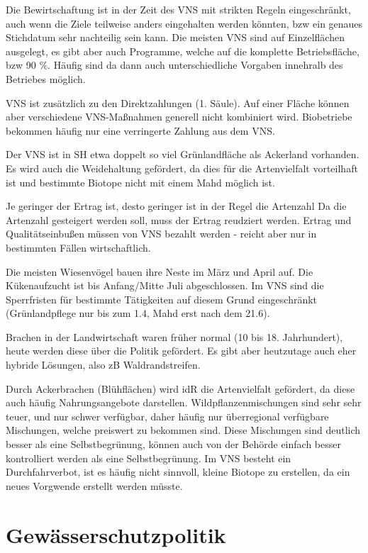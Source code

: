 \documentclass[11pt]{scrbook}
\begin{document}
Die Bewirtschaftung ist in der Zeit des \ac{VNS} mit strikten Regeln eingeschränkt, auch wenn die Ziele teilweise anders eingehalten werden könnten, bzw ein genaues Stichdatum sehr nachteilig sein kann.
Die meisten \ac{VNS} sind auf Einzelflächen ausgelegt, es gibt aber auch Programme, welche auf die komplette Betriebsfläche, bzw 90 \%.
Häufig sind da dann auch unterschiedliche Vorgaben innehralb des Betriebes möglich.

\ac{VNS} ist zusätzlich zu den Direktzahlungen (1. Säule).
Auf einer Fläche können aber verschiedene \ac{VNS}-Maßnahmen generell nicht kombiniert wird.
Biobetriebe bekommen häufig nur eine verringerte Zahlung aus dem \ac{VNS}.

Der \ac{VNS} ist in SH etwa doppelt so viel Grünlandfläche als Ackerland vorhanden.
Es wird auch die Weidehaltung gefördert, da dies für die Artenvielfalt vorteilhaft ist und bestimmte Biotope nicht mit einem Mahd möglich ist.

Je geringer der Ertrag ist, desto geringer ist in der Regel die Artenzahl
Da die Artenzahl gesteigert werden soll, muss der Ertrag reudziert werden.
Ertrag und Qualitätseinbußen müssen von \ac{VNS} bezahlt werden - reicht aber nur in bestimmten Fällen wirtschaftlich.

Die meisten Wiesenvögel bauen ihre Neste im März und April auf.
Die Kükenaufzucht ist bis Anfang/Mitte Juli abgeschlossen.
Im \ac{VNS} sind die Sperrfristen für bestimmte Tätigkeiten auf diesem Grund eingeschränkt (Grünlandpflege nur bis zum 1.4, Mahd erst nach dem 21.6).

Brachen in der Landwirtschaft waren früher normal (10 bis 18. Jahrhundert), heute werden diese über die Politik gefördert.
Es gibt aber heutzutage auch eher hybride Lösungen, also zB Waldrandstreifen.

Durch Ackerbrachen (Blühflächen) wird idR die Artenvielfalt gefördert, da diese auch häufig Nahrungsangebote darstellen.
Wildpflanzenmischungen sind sehr sehr teuer, und nur schwer verfügbar, daher häufig nur überregional verfügbare Mischungen, welche preiswert zu bekommen sind.
Diese Mischungen sind deutlich besser als eine Selbstbegrünung, können auch von der Behörde einfach besser kontrolliert werden als eine Selbstbegrünung.
Im \ac{VNS} besteht ein Durchfahrverbot, ist es häufig nicht sinnvoll, kleine Biotope zu erstellen, da ein neues Vorgwende erstellt werden müsste.


\section{Gewässerschutzpolitik}
\end{document}
